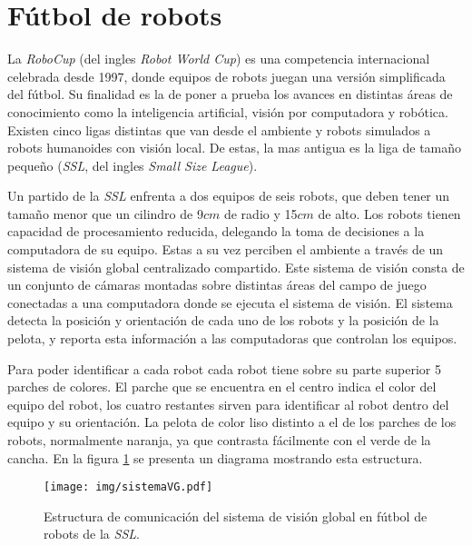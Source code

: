 
\section{Fútbol de robots}

La \emph{RoboCup}\cite{robocupHist} (del ingles \emph{Robot World Cup}) es una
competencia internacional celebrada desde 1997, donde equipos de robots juegan
una versión simplificada del fútbol. Su finalidad es la de poner a prueba los
avances en distintas áreas de conocimiento como la inteligencia artificial,
visión por computadora y robótica. Existen cinco ligas distintas que van desde
el ambiente y robots simulados a robots humanoides con visión local. De estas,
la mas antigua es la liga de tamaño pequeño (\emph{SSL}, del ingles \emph{Small
Size League}).

Un partido de la \emph{SSL} enfrenta a dos equipos de seis robots, que deben
tener un tamaño menor que un cilindro de 9$cm$ de radio y 15$cm$ de
alto\cite{sslrules2015}. Los robots tienen capacidad de procesamiento reducida,
delegando la toma de decisiones a la computadora de su equipo. Estas a su vez
perciben el ambiente a través de un sistema de visión global centralizado
compartido. Este sistema de visión consta de un conjunto de cámaras montadas
sobre distintas áreas del campo de juego conectadas a una computadora donde se
ejecuta el sistema de visión. El sistema detecta la posición y orientación de
cada uno de los robots y la posición de la pelota, y reporta esta información a
las computadoras que controlan los equipos.

Para poder identificar a cada robot cada robot tiene sobre su parte superior 5
parches de colores. El parche que se encuentra en el centro indica el color del
equipo del robot, los cuatro restantes sirven para identificar al robot dentro
del equipo y su orientación. La pelota de color liso distinto a el de los
parches de los robots, normalmente naranja, ya que contrasta fácilmente con el
verde de la cancha. En la figura \ref{sistemaVG} se presenta un diagrama
mostrando esta estructura.

\begin{figure}[!h]

	\texttt{[image: img/sistemaVG.pdf]}
	\caption{Estructura de comunicación del sistema de visión global en
	fútbol de robots de la \emph{SSL}.}
	\label{sistemaVG}

\end{figure}

